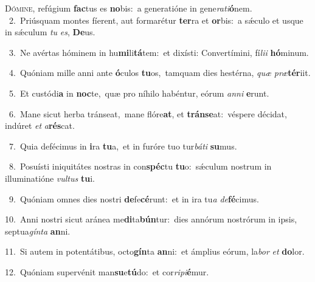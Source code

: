 \lettrine{\initial\textcolor{\initialcolor}{D}}{ómine,} refúgium \textbf{fac}\-tus es \textbf{no}\-bis:~\star a generatióne in gene\-\textit{ra}\-\textit{ti}\textbf{ó}nem.\\
{\numbfont\textcolor{\numbcolor}{~2.}}~Priúsquam montes fíerent, aut formarétur \textbf{ter}\-ra et \textbf{or}\-bis:~\star a sǽculo et usque in sǽculum \textit{tu} \textit{es}\-, \textbf{De}\-us.\par
{\numbfont\textcolor{\numbcolor}{~3.}}~Ne avértas hóminem in hu\-\textbf{mi}\-li\-\textbf{tá}\-tem:~\star et dixísti: Convertímini, fí\-\textit{li}\-\textit{i} \textbf{hó}\-minum.\par
{\numbfont\textcolor{\numbcolor}{~4.}}~Quóniam mille anni ante \textbf{ó}\-culos \textbf{tu}\-os,~\star tamquam dies hestérna, \textit{quæ} \textit{præ}\-\textbf{tér}iit.\par
{\numbfont\textcolor{\numbcolor}{~5.}}~Et custódi\textbf{a} in \textbf{noc}\-te,~\star quæ pro níhilo habéntur, eórum \textit{an}\-\textit{ni} \textbf{e}\-runt.\par
{\numbfont\textcolor{\numbcolor}{~6.}}~Mane sicut herba tránseat,~\dagger mane flóre\-\textbf{at}\-, et \textbf{tráns}\-\textbf{e}at:~\star véspere décidat, indúret \textit{et} \textit{a}\-\textbf{rés}cat.\par
{\numbfont\textcolor{\numbcolor}{~7.}}~Quia defécimus in \textbf{i}\-ra \textbf{tu}\-a,~\star et in furóre tuo tur\-\textit{bá}\-\textit{ti} \textbf{su}\-mus.\par
{\numbfont\textcolor{\numbcolor}{~8.}}~Posuísti iniquitátes nostras in con\-\textbf{spéc}\-tu \textbf{tu}\-o:~\star sǽculum nostrum in illuminatióne \textit{vul}\-\textit{tus} \textbf{tu}\-i.\par
{\numbfont\textcolor{\numbcolor}{~9.}}~Quóniam omnes dies nostri \textbf{de}\-fe\-\textbf{cé}\-runt:~\star et in ira tu\textit{a} \textit{de}\-\textbf{fé}cimus.\par
{\numbfont\textcolor{\numbcolor}{10.}}~Anni nostri sicut aránea me\-\textbf{di}\-ta\-\textbf{bún}\-tur:~\star dies annórum nostrórum in ipsis, septua\-\textit{gín}\-\textit{ta} \textbf{an}\-ni.\par
{\numbfont\textcolor{\numbcolor}{11.}}~Si autem in potentátibus, octo\-\textbf{gín}\-ta \textbf{an}\-ni:~\star et ámplius eórum, la\textit{bor} \textit{et} \textbf{do}\-lor.\par
{\numbfont\textcolor{\numbcolor}{12.}}~Quóniam supervénit man\-\textbf{su}\-e\-\textbf{tú}\-do:~\star et cor\-\textit{ri}\-\textit{pi}\textbf{é}mur.\par
